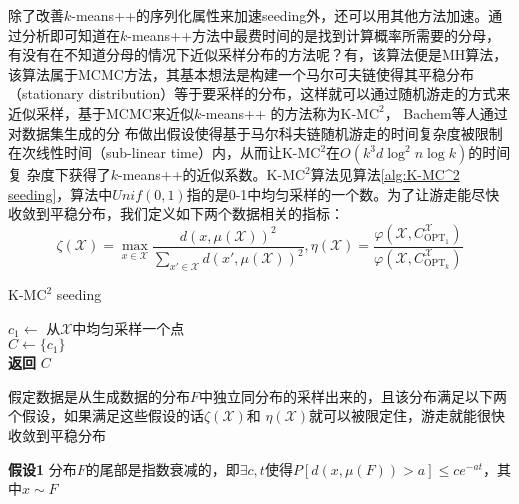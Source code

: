 除了改善$k$-means++的序列化属性来加速seeding外，还可以用其他方法加速。通过分析即可知道在$k$-means++方法中最费时间的是找到计算概率所需要的分母，有没有在不知道分母的情况下近似采样分布的方法呢？有，该算法便是MH算法，该算法属于MCMC方法，其基本想法是构建一个马尔可夫链使得其平稳分布（stationary distribution）等于要采样的分布，这样就可以通过随机游走的方式来近似采样，基于MCMC来近似$k$-means++
的方法称为K-M$\text{C}^2$， Bachem等人通过对数据集生成的分
布做出假设使得基于马尔科夫链随机游走的时间复杂度被限制在次线性时间（sub-linear time）内，从而让K-M$\text{C}^2$在$O(k^3 d \log^2 n \log k)$的时间复
杂度下获得了$k$-means++的近似系数。K-M$\text{C}^2$算法见算法\ref{alg:K-MC^2 seeding}，算法中$Unif(0,1)$指的是0-1中均匀采样的一个数。为了让游走能尽快收敛到平稳分布，我们定义如下两个数据相关的指标：
\begin{equation*}
\zeta(\mathcal{X}) = \max\limits_{x \in \mathcal{X}}\frac{d(x,\mu(\mathcal{X}))^2}{\sum_{x' \in \mathcal{X}}d(x',\mu(\mathcal{X}))^2}, \eta(\mathcal{X}) = \frac{\varphi(\mathcal{X},C_{\text{OPT}_1}^{\mathcal{X}})}{\varphi(\mathcal{X},C_{\text{OPT}_k}^{\mathcal{X}})}
\end{equation*}
\begin{algorithm}
    \caption{K-M$\text{C}^2$ seeding}\label{alg:K-MC^2 seeding}
    $c_1 \gets $ 从$\mathcal{X}$中均匀采样一个点 \\
    $C \gets \{c_1\}$ \\
    \textbf{返回} $C$ %
\end{algorithm}
假定数据是从生成数据的分布$F$中独立同分布的采样出来的，且该分布满足以下两个假设，如果满足这些假设的话$\zeta(\mathcal{X})$和
$\eta(\mathcal{X})$就可以被限定住，游走就能很快收敛到平稳分布

\textbf{假设1} 分布$F$的尾部是指数衰减的，即$\exists c,t $使得$P[d(x,\mu(F))>a]\leq ce^{-at}$，其中$x\sim F$ 

